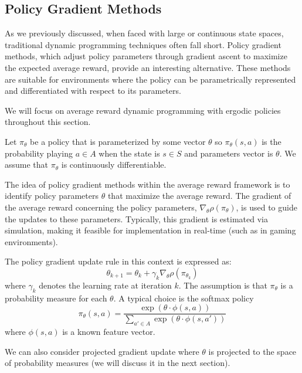 \documentclass[letter,11pt]{article}
\begin{document}
\subsection{Policy Gradient Methods} \label{Section:Policy}
As we previously discussed, when faced with large or continuous state spaces, traditional dynamic programming techniques often fall short. Policy gradient methods, which adjust policy parameters through gradient ascent to maximize the expected average reward, provide an interesting alternative. These methods are suitable for environments where the policy can be parametrically represented and differentiated with respect to its parameters.

We will focus on average reward dynamic programming with ergodic policies throughout this section. 

Let $\pi_{\theta}$ be a policy that is parameterized by some vector $\theta$ so $\pi_{\theta}(s,a)$ is the probability playing $a \in A$ when the state is $s \in S$ and parameters vector is $\theta$. We assume that $\pi_{\theta}$ is continuously differentiable. 


The idea of policy gradient methods within the average reward framework is to identify policy parameters $\theta$ that maximize the average reward. The gradient of the average reward concerning the policy parameters, $\nabla_\theta \rho(\pi_\theta)$, is used to guide the updates to these parameters. Typically, this gradient is estimated via simulation, making it feasible for implementation in real-time (such as in gaming environments). 

The policy gradient update rule in this context is expressed as:
\[
\theta_{k+1} = \theta_k + \gamma_k \nabla_\theta \rho(\pi_{\theta_k})
\]
where $\gamma_k$ denotes the learning rate at iteration $k$. The assumption is that $\pi_{\theta}$ is a probability measure for each $\theta$. A typical choice is the softmax policy  
$$ \pi_{\theta} (s,a ) = \frac{\exp (\theta \cdot \phi(s,a) ) }{\sum_{a' \in A} \exp (\theta \cdot \phi(s,a') )  }$$
where $\phi(s,a)$ is a known feature vector. 

We can also consider projected gradient update  where $\theta$ is projected to the space of probability measures (we will discuss it in the next section). 
\end{document}

